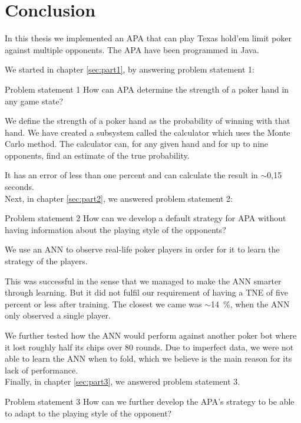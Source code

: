 \section{Conclusion}
In this thesis we implemented an APA that can play Texas hold'em limit poker against multiple opponents. The APA have been programmed in Java.

We started in chapter \ref{sec:part1}, by answering problem statement 1:
\vspace{4mm}
\begin{statementBox2}{Problem statement 1}
How can APA determine the strength of a poker hand in any game state?
\end{statementBox2}
\vspace{4mm}

We define the strength of a poker hand as the probability of winning with that hand.
We have created a subsystem called the calculator which uses the Monte Carlo method. The calculator can, for any given hand and for up to nine opponents, find an estimate of the true probability. 

It has an error of less than one percent and can calculate the result in $\sim$0,15 seconds.\\

Next, in chapter \ref{sec:part2}, we answered problem statement 2:
\vspace{4mm}
\begin{statementBox2}{Problem statement 2}
How can we develop a default strategy for APA without having information about the playing style of the opponents?
\end{statementBox2}
\vspace{4mm}

We use an ANN to observe real-life poker players in order for it to learn the strategy of the players. 

This was successful in the sense that we managed to make the ANN smarter through learning. But it did not fulfil our requirement of having a TNE of five percent or less after training. The closest we came was $\sim$14~\%, when the ANN only observed a single player. 

We further tested how the ANN would perform against another poker bot where it lost roughly half its chips over 80 rounds. Due to imperfect data, we were not able to learn the ANN when to fold, which we believe is the main reason for its lack of performance.\\

Finally, in chapter \ref{sec:part3}, we answered problem statement 3.
\vspace{4mm}
\begin{statementBox2}{Problem statement 3}
How can we further develop the APA's strategy to be able to adapt to the playing style of the opponent?
\end{statementBox2}
\vspace{4mm}


